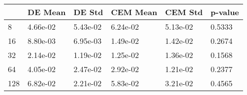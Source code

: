 \begin{tabular}{llllll}
\toprule
{} &   DE Mean &    DE Std &  CEM Mean &   CEM Std & p-value \\
\midrule
8   &  4.66e-02 &  5.43e-02 &  6.24e-02 &  5.13e-02 &  0.5333 \\
16  &  8.80e-03 &  6.95e-03 &  1.49e-02 &  1.42e-02 &  0.2674 \\
32  &  2.14e-02 &  1.19e-02 &  1.25e-02 &  1.36e-02 &  0.1568 \\
64  &  4.05e-02 &  2.47e-02 &  2.92e-02 &  1.21e-02 &  0.2377 \\
128 &  6.82e-02 &  2.21e-02 &  5.83e-02 &  3.21e-02 &  0.4565 \\
\bottomrule
\end{tabular}
